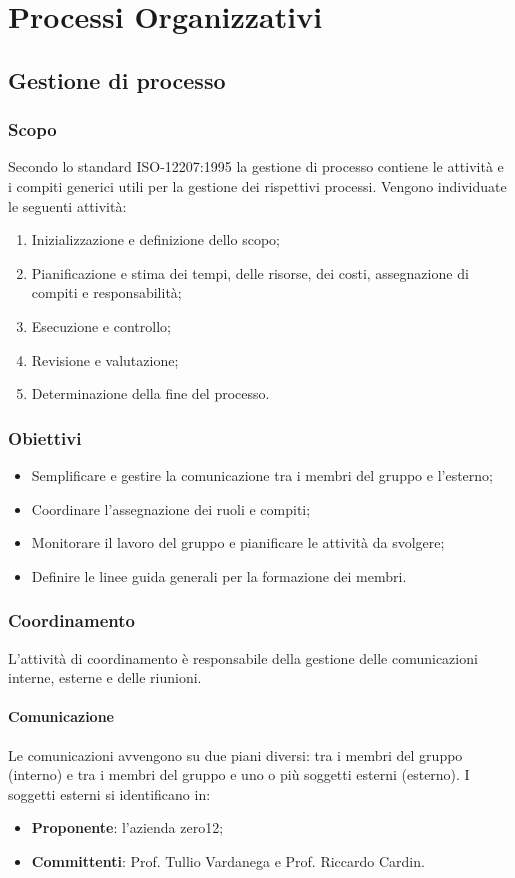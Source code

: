 \section{Processi Organizzativi}

\subsection{Gestione di processo}

\subsubsection{Scopo}
Secondo lo standard ISO-12207:1995 la gestione di processo contiene le attività e i compiti generici utili per la gestione dei rispettivi processi. Vengono individuate le seguenti attività:
\begin{enumerate}
\item Inizializzazione e definizione dello scopo;
\item Pianificazione e stima dei tempi, delle risorse, dei costi, assegnazione di compiti e responsabilità;
\item Esecuzione e controllo;
\item Revisione e valutazione;
\item Determinazione della fine del processo.
\end{enumerate}

\subsubsection{Obiettivi}
\begin{itemize}
\item Semplificare e gestire la comunicazione tra i membri del gruppo e l'esterno;
\item Coordinare l'assegnazione dei ruoli e compiti;
\item Monitorare il lavoro del gruppo e pianificare le attività da svolgere;
\item Definire le linee guida generali per la formazione dei membri.
\end{itemize}

\subsubsection{Coordinamento}
L'attività di coordinamento è responsabile della gestione delle comunicazioni interne, esterne e delle riunioni.


\paragraph{Comunicazione}
Le comunicazioni avvengono su due piani diversi: tra i membri del gruppo (interno) e tra i membri del gruppo e uno o più soggetti esterni (esterno). I soggetti esterni si identificano in:
\begin{itemize}
\item \textbf{Proponente}: l'azienda zero12;
\item \textbf{Committenti}:  Prof. Tullio Vardanega e Prof. Riccardo Cardin.
\end{itemize}

